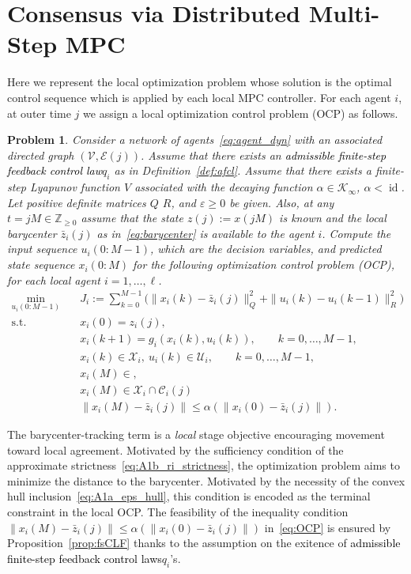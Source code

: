 \documentclass[12pt,draftcls,onecolumn]{IEEEtran}
\newtheorem{problem}{Problem}
\def\field#1{\mathbb #1}%
\def\Z{\field{Z}}%
\newcommand{\X}{\ensuremath{\mathcal X}}
\newcommand{\U}{\ensuremath{\mathcal U}}
\newcommand{\Zp}{\Z_{\geq 0}}
\DeclareMathOperator{\id}{id}
\def\Kinf{\mathcal{K}_\infty}%
\providecommand{\afcl}{\textcolor{black}{admissible finite-step feedback control law}\xspace}
\providecommand{\afcls}{\textcolor{black}{admissible finite-step feedback control laws}\xspace}
\begin{document}
\section{Consensus via Distributed Multi-Step MPC}
\label{subsec:dmpc}

Here we represent the local optimization problem whose solution is the optimal control sequence which is applied by each local MPC controller.
For each agent $i$, at outer time $j$ we assign a local optimization control problem (OCP) as follows.

\begin{problem} \label{prob:local-OCP}
Consider a network of agents~\eqref{eq:agent_dyn} with an associated directed graph $(\mathcal{V},\mathcal{E}(j))$.
Assume that there exists an \afcl $q_i$ as in Definition~\ref{def:afcl}.
Assume that there exists a finite-step Lyapunov function $V$ associated with the decaying function $\alpha \in \Kinf$, $\alpha < \id$. Let positive definite matrices $Q$ $R$, and $\varepsilon \geq 0$ be given.
Also, at any $t = jM \in \Zp$ assume that the state $z(j) := x(jM)$ is known and the local barycenter $\bar{z}_i (j)$ as in~\eqref{eq:barycenter} is available to the agent $i$.
Compute the input sequence $u_i(0{:}M-1)$, which are the decision variables, and predicted state sequence $x_i(0{:}M)$ for the following optimization control problem (OCP), for each local agent $i = 1,\dots,\ell$.
\begin{equation}\label{eq:OCP}
\begin{aligned}
\min_{u_i(0{:}M-1)}\quad &
J_i := \sum_{k=0}^{M-1}\Big(\|x_i(k)-\bar z_i(j)\|_Q^2 + \|u_i(k)-u_i(k-1)\|_{R}^2\Big)\\
\text{s.t.}\quad
& x_i(0)=z_i(j),\\
& x_i(k+1)=g_i(x_i(k),u_i(k)),\qquad k=0,\dots,M-1,\\
& x_i(k)\in \X_i,\ u_i(k)\in \U_i,\qquad k=0,\dots,M-1,\\
& x_i(M)\in ,\\
& x_i(M)\in \X_i \cap \mathcal{C}_i (j) \\
& \| x_i(M)-\bar z_i(j) \| \leq \alpha (\| x_i(0)-\bar z_i(j) \|).
\end{aligned}
\end{equation} 
\end{problem}

The barycenter-tracking term is a \emph{local} stage objective encouraging movement toward local agreement.
Motivated by the sufficiency condition of the approximate strictness~\eqref{eq:A1b_ri_strictness}, the optimization problem aims to minimize the distance to the barycenter.
Motivated by the necessity of the convex hull inclusion~\eqref{eq:A1a_eps_hull}, this condition is encoded as the terminal constraint in the local OCP.
The feasibility of the inequality condition $\| x_i(M)-\bar z_i(j) \| \leq \alpha (\| x_i(0)-\bar z_i(j) \|)$ in~\eqref{eq:OCP} is ensured by Proposition~\ref{prop:fsCLF} thanks to the assumption on the exitence of \afcls $q_i$'s.
\end{document}
